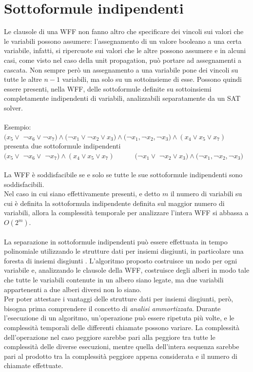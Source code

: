 \section{Sottoformule indipendenti}
Le clausole di una WFF non fanno altro che specificare dei vincoli sui valori che le
variabili possono assumere: l'assegnamento di un valore booleano a una certa variabile, infatti, si ripercuote sui valori che le altre  possono assumere e in alcuni casi, come visto nel caso della unit propagation, può portare ad assegnamenti a cascata.
Non sempre però un assegnamento a una variabile pone dei vincoli su tutte le altre $n-1$ variabili, ma solo su un sottoinsieme di esse. Possono quindi essere presenti, nella WFF, delle sottoformule definite su sottoinsiemi completamente indipendenti di variabili, analizzabili separatamente da un SAT solver.\\
\\
Esempio:\\
$(x_5 \lor$ ¬$x_6 \lor $¬$x_7) \land ($¬$x_1 \lor $¬$x_2 \lor x_3) \land ($¬$x_1, $¬$x_2, $¬$x_3) \land (x_4 \lor x_5 \lor x_7)$\\
presenta due sottoformule indipendenti\\
$(x_5 \lor$ ¬$x_6 \lor$ ¬$x_7) \land (x_4 \lor x_5 \lor x_7) \quad \quad \quad ($¬$x_1 \lor$ ¬$x_2 \lor x_3) \land ($¬$x_1, $¬$x_2, $¬$x_3)$\\
\\
La WFF è soddisfacibile se e solo se tutte le sue sottoformule indipendenti sono soddisfacibili.\\
Nel caso in cui siano effettivamente presenti, e detto $m$ il numero di variabili su cui è definita la sottoformula indipendente definita sul maggior numero di variabili, allora la complessità temporale per analizzare l'intera WFF si abbassa a $O(2^m)$.\\
\\
La separazione in sottoformule indipendenti può essere effettuata in tempo polinomiale utilizzando le strutture dati per insiemi disgiunti, in particolare una foresta di insiemi disgiunti \cite{intro_algo}.
L'algoritmo proposto costruisce un nodo per ogni variabile e, analizzando le clausole della WFF, costruisce degli alberi in modo tale che tutte le variabili contenute in un albero siano legate, ma due variabili appartenenti a due alberi diversi non lo siano.\\
Per poter attestare i vantaggi delle strutture dati per insiemi disgiunti, però, bisogna prima comprendere il concetto di \textit{analisi ammortizzata}. Durante l'esecuzione di un algoritmo, un'operazione può essere ripetuta più volte, e le complessità temporali delle differenti chiamate possono variare. La complessità dell'operazione nel caso peggiore sarebbe pari alla peggiore tra tutte le complessità delle diverse esecuzioni, mentre quella dell'intera sequenza sarebbe pari al prodotto tra la complessità peggiore appena considerata e il numero di chiamate effettuate.

